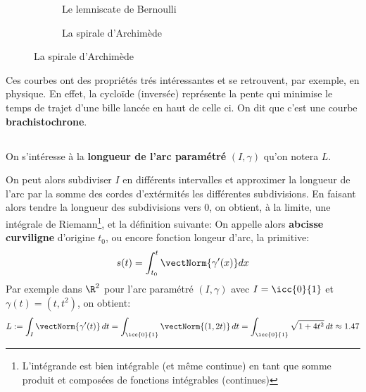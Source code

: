 \begin{figure}[h]
\begin{subfigure}{.3\textwidth}
      \caption*{Le lemniscate de Bernoulli}
   \end{subfigure}\quad
   \begin{subfigure}{.3\textwidth}
      \centering
      \caption*{La spirale d'Archimède}
   \end{subfigure}\quad
\end{figure}

Ces courbes ont des propriétés trés intéressantes et se retrouvent, par exemple, en physique. En effet, la cycloïde (inversée) représente la pente qui minimise le temps de trajet d'une bille lancée en haut de celle ci. On dit que c'est une courbe \textbf{brachistochrone}.

\subsection*{}
On s'intéresse à la \textbf{longueur de l'arc paramétré} \((I, \gamma)\) qu'on notera \(L\).\<

On peut alors subdiviser \(I\) en différents intervalles et approximer la longueur de l'arc par la somme des cordes d'extérmités les différentes subdivisions. En faisant alors tendre la longueur des subdivisions vers 0, on obtient, à la limite, une intégrale de Riemann\footnote[1]{L'intégrande est bien intégrable (et même continue) en tant que somme produit et composées de fonctions intégrables (continues)}, et la définition suivante:
On appelle alors \textbf{abcisse curviligne} d'origine \(t_0\), ou encore fonction longeur d'arc, la primitive:
\[
   s(t) = \int_{t_0}^{t} \vectNorm{\gamma'(x)} d x
\]
Par exemple dans \(\R^2\) pour l'arc paramétré \((I, \gamma)\) avec \(I = \icc{0}{1}\) et \(\gamma(t) = (t, t^2)\), on obtient:
\[
   L := \int_{I} \vectNorm{\gamma'(t)}\,dt = \int_{\icc{0}{1}} \vectNorm{(1, 2t)}\,dt = \int_{\icc{0}{1}}\sqrt{1 + 4t^2}\,dt \approx 1.47
\]
\pagebreak

